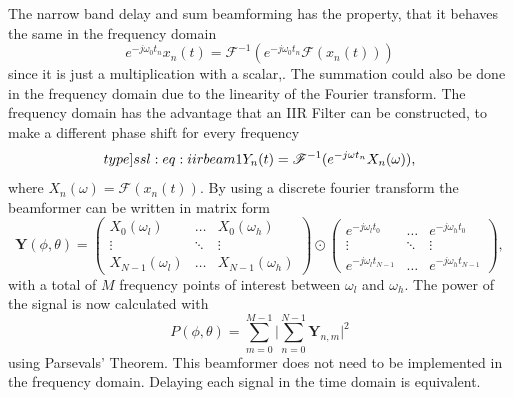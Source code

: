 The narrow band delay and sum beamforming has the property, that it behaves
the same in the frequency domain
\begin{equation}
	e^{-j\omega_0 t_n} x_n(t) = \mathscr{F}^{-1}(e^{-j\omega_0 t_n} \mathscr{F}(x_n(t)))
\end{equation}
since it is just a multiplication with a scalar,.
The summation could also be done in the frequency domain due to the
linearity of the Fourier transform.
The frequency domain has the advantage that an IIR Filter can be constructed, to
make a different phase shift for every frequency
\begin{equation}
	\label[type]{ssl:eq:iirbeam1}
	Y_n(t) = \mathscr{F}^{-1}(e^{-j\omega t_n} X_n(\omega)),
\end{equation}
where $X_n(\omega) = \mathscr{F}(x_n(t))$.
By using a discrete fourier transform the beamformer can be written
in matrix form
\begin{equation}
	\bm{Y}(\phi, \theta) =
	\begin{pmatrix}
		X_0(\omega_l)     & \hdots & X_0(\omega_h)     \\
		\vdots            & \ddots & \vdots            \\
		X_{N-1}(\omega_l) & \hdots & X_{N-1}(\omega_h)
	\end{pmatrix}
	\odot
	\begin{pmatrix}
		e^{-j\omega_l t_0}     & \hdots & e^{-j\omega_h t_0}     \\
		\vdots                 & \ddots & \vdots                 \\
		e^{-j\omega_l t_{N-1}} & \hdots & e^{-j\omega_h t_{N-1}}
	\end{pmatrix},
\end{equation}
with a total of $M$ frequency points of interest between $\omega_l$ and $\omega_h$.
The power of the signal is now calculated with
\begin{equation}
	P(\phi, \theta) =  \sum_{m=0}^{M-1}\lvert \sum_{n=0}^{N-1} \bm{Y}_{n, m} \rvert^2
\end{equation}
using Parsevals' Theorem.
This beamformer does not need to be implemented in the frequency domain.
Delaying each signal in the time domain is equivalent.

